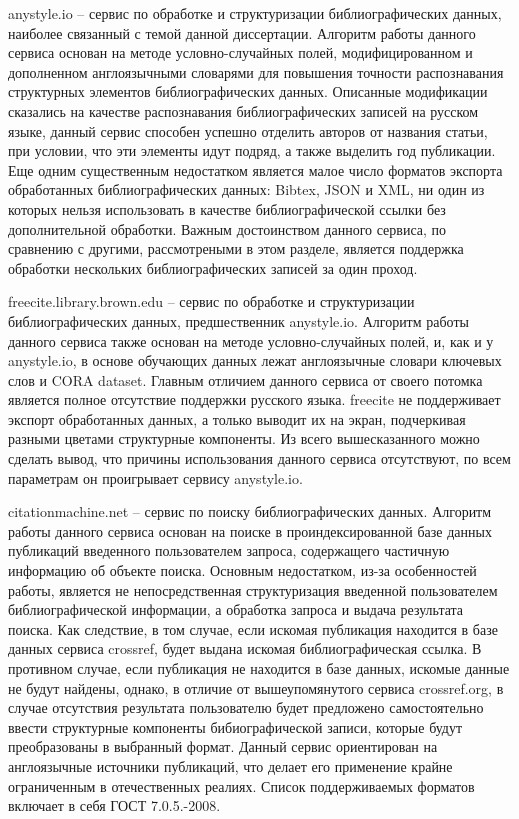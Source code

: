 anystyle.io -- сервис по обработке и структуризации библиографических данных, наиболее связанный с темой данной диссертации. Алгоритм работы данного сервиса основан на методе условно-случайных полей, модифицированном и дополненном англоязычными словарями для повышения точности распознавания структурных элементов библиографических данных. Описанные модификации сказались на качестве распознавания библиографических записей на русском языке, данный сервис способен успешно отделить авторов от названия статьи, при условии, что эти элементы идут подряд, а также выделить год публикации. Еще одним существенным недостатком является малое число форматов экспорта обработанных библиографических данных: Bibtex, JSON и XML, ни один из которых нельзя использовать в качестве библиографической ссылки без дополнительной обработки. Важным достоинством данного сервиса, по сравнению с другими, рассмотреными в этом разделе, является поддержка обработки нескольких библиографических записей за один проход.

freecite.library.brown.edu -- сервис по обработке и структуризации библиографических данных, предшественник anystyle.io. Алгоритм работы данного сервиса также основан на методе условно-случайных полей, и, как и у anystyle.io, в основе обучающих данных лежат англоязычные словари ключевых слов и CORA dataset. Главным отличием данного сервиса от своего потомка является полное отсутствие поддержки русского языка. freecite не поддерживает экспорт обработанных данных, а только выводит их на экран, подчеркивая разными цветами структурные компоненты. Из всего вышесказанного можно сделать вывод, что причины использования данного сервиса отсутствуют, по всем параметрам он проигрывает сервису anystyle.io.

citationmachine.net -- сервис по поиску библиографических данных. Алгоритм работы данного сервиса основан на поиске в проиндексированной базе данных публикаций введенного пользователем запроса, содержащего частичную информацию об объекте поиска. Основным недостатком, из-за особенностей работы, является не непосредственная структуризация введенной пользователем библиографической информации, а обработка запроса и выдача результата поиска. Как следствие, в том случае, если искомая публикация находится в базе данных сервиса crossref, будет выдана искомая библиографическая ссылка. В противном случае, если публикация не находится в базе данных, искомые данные не будут найдены, однако, в отличие от вышеупомянутого сервиса crossref.org, в случае отсутствия результата пользователю будет предложено самостоятельно ввести структурные компоненты бибиографической записи, которые будут преобразованы в выбранный формат. Данный сервис ориентирован на англоязычные источники публикаций, что делает его применение крайне ограниченным в отечественных реалиях. Список поддерживаемых форматов включает в себя ГОСТ 7.0.5.-2008.

